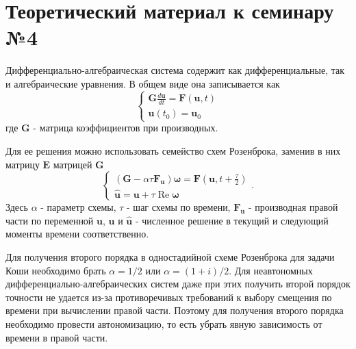 \section{Теоретический материал к семинару №4}
Дифференциально-алгебраическая система содержит как дифференциальные, так и алгебраические уравнения. В общем виде она записывается как
\begin{equation} \label{c4eq1}
	\begin{cases}
		\displaystyle \mathbf{G} \frac{d\mathbf{u}}{dt} = \mathbf{F} \left( \mathbf{u}, t \right) \\
		\mathbf{u}(t_0) = \mathbf{u}_0
	\end{cases}
\end{equation}
где $\mathbf{G}$ - матрица коэффициентов при производных. 

Для ее решения можно использовать семейство схем Розенброка, заменив в них матрицу $\mathbf{E}$ матрицей $\mathbf{G}$  
\begin{equation} \label{c4eq2}
	\begin{cases}
		\displaystyle \left( \mathbf{G} - \alpha \tau \mathbf{F_u} \right) \boldsymbol{\omega} = \mathbf{F} \left( \mathbf{u}, t + \frac{\tau}{2} \right) \\
		\mathbf{\hat{u}} = \mathbf{u} + \tau \operatorname{Re} \boldsymbol{\omega}
	\end{cases}.
\end{equation}
Здесь $\alpha$ - параметр схемы, $\tau$ - шаг схемы по времени, $\mathbf{F_u}$ - производная правой части по переменной $\mathbf{u}$, $\mathbf{u}$ и $\mathbf{\hat{u}}$ - численное решение в текущий и следующий моменты времени соответственно.

Для получения второго порядка в одностадийной схеме Розенброка для задачи Коши необходимо брать
$\alpha = 1/2$ или $\alpha = (1+i)/2$. Для неавтономных дифференциально-алгебраических систем даже при этих   получить второй порядок точности не удается из-за противоречивых требований к выбору смещения по времени при вычислении правой части. Поэтому для получения второго порядка необходимо провести автономизацию, то есть убрать явную зависимость от времени в правой части.

